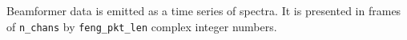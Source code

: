 \documentclass[11pt,english,twoside]{article}
\begin{document}
Beamformer data is emitted as a time series of spectra. It is presented in frames of {\tt n\_chans} by {\tt feng\_pkt\_len} complex integer numbers.


\begin{comment}
\section{Raw voltage capture mode}
This mode allows for raw streaming of ADC voltages for one or both polarisations. 

Upon entering the raw voltage capture mode, the following SPEAD metadata is issued:

\begin{enumerate}
\item If the system was already outputting data products, a SPEAD end of stream notification is issued.
\item A single SPEAD \emph{Heap} containing the \emph{ItemDescriptor}s and system time synchronisation \emph{Item}s is issued.
\item A SPEAD \emph{Heap} containing all the \emph{ItemDescriptor}s and initial values for each ADCs' analogue gain as well as the system's digital gain stages is issued as each input is initialised.
\item A SPEAD \emph{Heap} containing the \emph{ItemDescriptor}s and initial values of the labels (names) of all physical inputs is issued as each input is initialised.
\item A single SPEAD \emph{Heap} containing the static \emph{ItemDescriptor}s and initial values for most static variables and system parameters is issued.
\item A single SPEAD \emph{Heap} containing the \emph{ItemDescriptor}s only for the FPGA-based 10GbE output products is issued to enable receivers to decode the emitted data.
\end{enumerate}


\end{comment}
\end{document}

